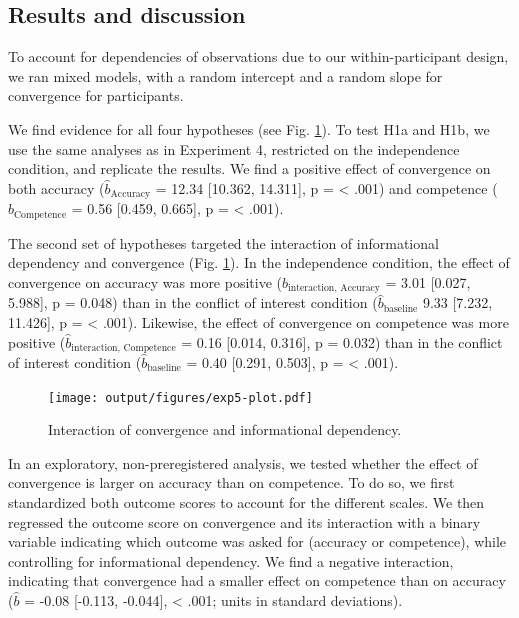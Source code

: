 \documentclass[
  doc,floatsintext]{apa6}
\begin{document}
\subsection{Results and discussion}\label{results-and-discussion-4}

To account for dependencies of observations due to our within-participant design, we ran mixed models, with a random intercept and a random slope for convergence for participants.

We find evidence for all four hypotheses (see Fig. \ref{fig:exp5-plot}). To test H1a and H1b, we use the same analyses as in Experiment 4, restricted on the independence condition, and replicate the results. We find a positive effect of convergence on both accuracy (\(\hat{b}_{\text{Accuracy}}\) = 12.34 {[}10.362, 14.311{]}, p = \textless{} .001) and competence (\(\hat{b}_{\text{Competence}}\) = 0.56 {[}0.459, 0.665{]}, p = \textless{} .001).

The second set of hypotheses targeted the interaction of informational dependency and convergence (Fig. \ref{fig:exp5-plot}). In the independence condition, the effect of convergence on accuracy was more positive (\(\hat{b}_{\text{interaction, Accuracy}}\) = 3.01 {[}0.027, 5.988{]}, p = 0.048) than in the conflict of interest condition (\(\hat{b}_{\text{baseline}}\) 9.33 {[}7.232, 11.426{]}, p = \textless{} .001). Likewise, the effect of convergence on competence was more positive (\(\hat{b}_{\text{interaction, Competence}}\) = 0.16 {[}0.014, 0.316{]}, p = 0.032) than in the conflict of interest condition (\(\hat{b}_{\text{baseline}}\) = 0.40 {[}0.291, 0.503{]}, p = \textless{} .001).



\begin{figure}
\centering
\texttt{[image: output/figures/exp5-plot.pdf]}
\caption{\label{fig:exp5-plot}Interaction of convergence and informational dependency.}
\end{figure}

In an exploratory, non-preregistered analysis, we tested whether the effect of convergence is larger on accuracy than on competence. To do so, we first standardized both outcome scores to account for the different scales. We then regressed the outcome score on convergence and its interaction with a binary variable indicating which outcome was asked for (accuracy or competence), while controlling for informational dependency. We find a negative interaction, indicating that convergence had a smaller effect on competence than on accuracy (\(\hat{b}\) = -0.08 {[}-0.113, -0.044{]}, \textless{} .001; units in standard deviations).
\end{document}

